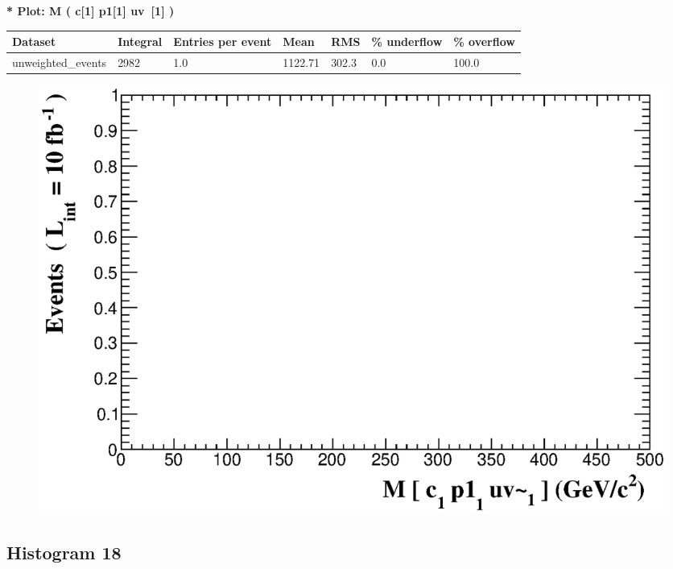 \documentclass[a4paper, 10pt]{article}
\begin{document}
\textbf{* Plot: M ( c[1] p1[1] uv~[1] ) }\\
   \begin{table}[H]
  \begin{center}
    \begin{tabular}{|m{23.0mm}|m{23.0mm}|m{18.0mm}|m{19.0mm}|m{19.0mm}|m{19.0mm}|m{19.0mm}|}
      \hline
      {\cellcolor{yellow}         Dataset}& {\cellcolor{yellow}         Integral}& {\cellcolor{yellow}         Entries per event}& {\cellcolor{yellow}         Mean}& {\cellcolor{yellow}         RMS}& {\cellcolor{yellow}         \% underflow}& {\cellcolor{yellow}         \% overflow}\\
      \hline
      {\cellcolor{white}         unweighted\_events}& {\cellcolor{white}         2982}& {\cellcolor{white}         1.0}& {\cellcolor{white}         1122.71}& {\cellcolor{white}         302.3}& {\cellcolor{red}         0.0}& {\cellcolor{red}         100.0}\\
\hline
    \end{tabular}
  \end{center}
\end{table}

\begin{figure}[H]
  \begin{center}
    \includegraphics[scale=0.45]{selection_16.eps}\\
\caption{   }
  \end{center}
\end{figure}
      \newpage
\subsection{ Histogram 18}
\end{document}
